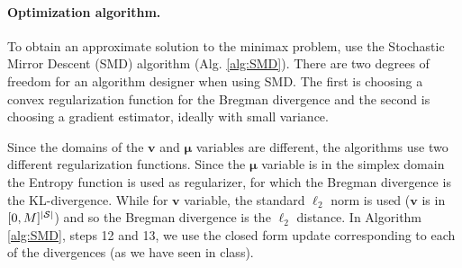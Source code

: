 \documentclass{article}
\DeclarePairedDelimiter\abs{\lvert}{\rvert}%
\newcommand{\States}{\mathcal{S}}
\newcommand{\nSt}{{\abs{\States}}}
\newcommand{\vb}{\boldsymbol{v}}
\newcommand{\mub}{\boldsymbol{\mu}}
\begin{document}


\paragraph{Optimization algorithm.}
To obtain an approximate solution to the minimax problem, \citet{jin20efficiently} use the Stochastic Mirror Descent (SMD) algorithm (Alg. \ref{alg:SMD}).
There are two degrees of freedom for an algorithm designer when using SMD.
The first is choosing a convex regularization function for the Bregman divergence and the second is choosing a gradient estimator, ideally with small variance.

Since the domains of the $\vb$ and $\mub$ variables are different, the algorithms use two different regularization functions. 
Since the $\mub$ variable is in the simplex domain the Entropy function is used as regularizer, for which  the Bregman divergence is the KL-divergence.
While for $\vb$ variable, the standard $\ell_2$ norm is used ($\vb$ is  in $[0,M]^{\nSt}$) and so the Bregman divergence is the $\ell_2$ distance.
In Algorithm \ref{alg:SMD}, steps 12 and 13, we use the closed form update corresponding to each of the divergences (as we have seen in class).
\end{document}
